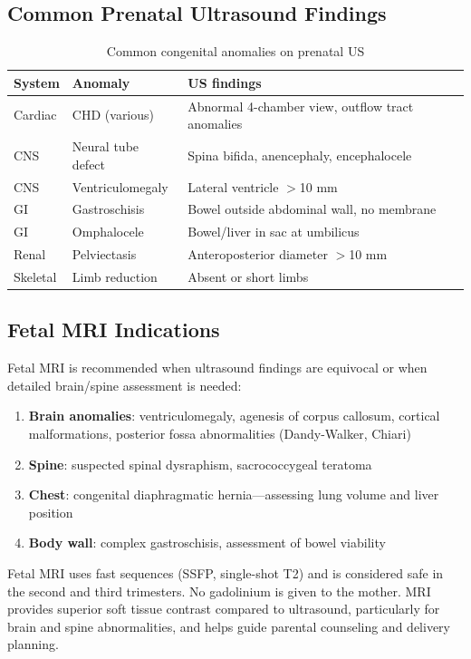 \subsection{Common Prenatal Ultrasound Findings}
\begin{table}[h]
\centering
\caption{Common congenital anomalies on prenatal US}
\begin{tabular}{|p{}|p{}|p{}|}
\hline
\textbf{System} & \textbf{Anomaly} & \textbf{US findings} \\
\hline
Cardiac & CHD (various) & Abnormal 4-chamber view, outflow tract anomalies \\
CNS & Neural tube defect & Spina bifida, anencephaly, encephalocele \\
CNS & Ventriculomegaly & Lateral ventricle $>$10 mm \\
GI & Gastroschisis & Bowel outside abdominal wall, no membrane \\
GI & Omphalocele & Bowel/liver in sac at umbilicus \\
Renal & Pelviectasis & Anteroposterior diameter $>$10 mm \\
Skeletal & Limb reduction & Absent or short limbs \\
\hline
\end{tabular}
\end{table}

\subsection{Fetal MRI Indications}
Fetal MRI is recommended when ultrasound findings are equivocal or when detailed brain/spine assessment is needed:
\begin{enumerate}
  \item \textbf{Brain anomalies}: ventriculomegaly, agenesis of corpus callosum, cortical malformations, posterior fossa abnormalities (Dandy-Walker, Chiari)
  \item \textbf{Spine}: suspected spinal dysraphism, sacrococcygeal teratoma
  \item \textbf{Chest}: congenital diaphragmatic hernia---assessing lung volume and liver position
  \item \textbf{Body wall}: complex gastroschisis, assessment of bowel viability
\end{enumerate}

\begin{pearlbox}
Fetal MRI uses fast sequences (SSFP, single-shot T2) and is considered safe in the second and third trimesters. No gadolinium is given to the mother. MRI provides superior soft tissue contrast compared to ultrasound, particularly for brain and spine abnormalities, and helps guide parental counseling and delivery planning.
\end{pearlbox}

